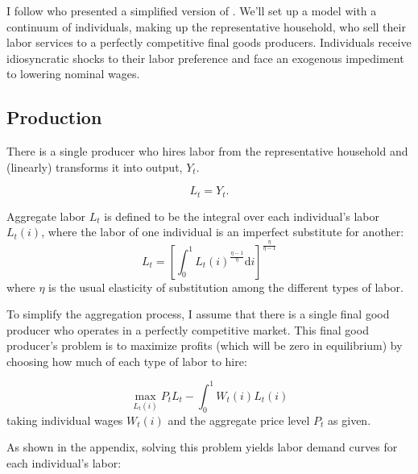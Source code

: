 \documentclass[12pt,a4paper]{scrartcl}            %
\begin{document}
I follow \cite{daly_hobijn_2013} who presented a simplified version of \cite{benigno_ricci_2011}.
We'll set up a model with a continuum of individuals, making up the representative household, who sell their labor services to a perfectly competitive final goods producers.
Individuals receive idiosyncratic shocks to their labor preference and face an exogenous impediment to lowering nominal wages.

\subsection{Production}
\label{sub:production}

There is a single producer who hires labor from the representative household and (linearly) transforms it into output, $Y_t$.

\begin{equation} \label{eq:agg_output}
    L_t = Y_t.
\end{equation}

Aggregate labor \(L_t\) is defined to be the integral over each individual's labor \(L_t(i)\), where the labor of one individual is an imperfect substitute for another:
%
\begin{equation} \label{eq:agg_labor}
    L_t = \left[ \int_0^1 L_t(i)^{\frac{\eta - 1}{\eta}} \mathrm{d}i \right]^{\frac{\eta}{\eta - 1}}
\end{equation}
%
where $\eta$ is the usual elasticity of substitution among the different types of labor.

To simplify the aggregation process, I assume that there is a single final good producer who operates in a perfectly competitive market.
This final good producer's problem is to maximize profits (which will be zero in equilibrium) by choosing how much of each type of labor to hire:

\begin{equation} \label{eq:firms_problem}
    \max_{L_t(i)} P_t L_t - \int_0^1 W_t(i)L_t(i)
\end{equation}
%
taking individual wages $W_t(i)$ and the aggregate price level $P_t$ as given.

As shown in the appendix, solving this problem yields labor demand curves for each individual's labor:
\end{document}
